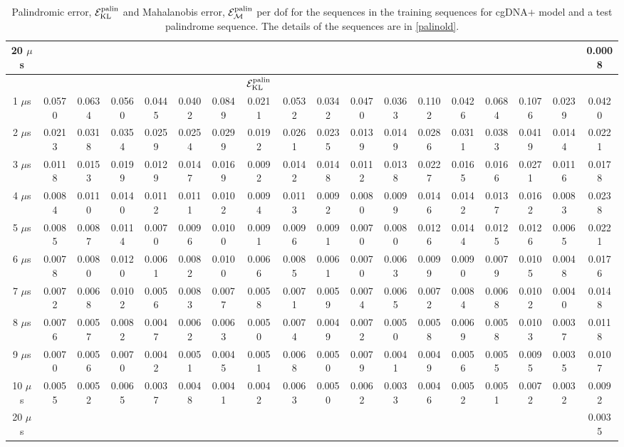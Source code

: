 \begin{table}
\begin{center}
\begin{footnotesize}
\begin{tabular}{| c | c c c c c c c c c c c c c c c c | c | }
20 $\mu$s & & & & & & & & & & & & & & & & & 0.0008 \\ \hline
& & & & & & & ${\mathcal E}_{\text{KL}}^{\text{palin}}$ & & & & & & & & & & \\ \hline
1  $\mu$s & 0.0570 & 0.0634 & 0.0560 & 0.0445 & 0.0402 & 0.0849 & 0.0211 & 0.0532 & 0.0342 & 0.0470 & 0.0363 & 0.1102 & 0.0426 & 0.0684 & 0.1076 & 0.0239 & 0.0420 \\ \hline
2  $\mu$s & 0.0213 & 0.0318 & 0.0354 & 0.0259 & 0.0254 & 0.0299 & 0.0192 & 0.0261 & 0.0235 & 0.0139 & 0.0149 & 0.0286 & 0.0311 & 0.0383 & 0.0419 & 0.0144 & 0.0221 \\ \hline
3  $\mu$s & 0.0118 & 0.0153 & 0.0199 & 0.0129 & 0.0147 & 0.0169 & 0.0092 & 0.0142 & 0.0148 & 0.0112 & 0.0138 & 0.0227 & 0.0165 & 0.0166 & 0.0271 & 0.0116 & 0.0178 \\ \hline
4  $\mu$s & 0.0084 & 0.0110 & 0.0140 & 0.0112 & 0.0111 & 0.0102 & 0.0094 & 0.0113 & 0.0092 & 0.0080 & 0.0099 & 0.0146 & 0.0142 & 0.0137 & 0.0162 & 0.0083 & 0.0238 \\ \hline
5  $\mu$s & 0.0085 & 0.0087 & 0.0114 & 0.0070 & 0.0096 & 0.0100 & 0.0091 & 0.0096 & 0.0091 & 0.0070 & 0.0080 & 0.0126 & 0.0144 & 0.0125 & 0.0126 & 0.0065 & 0.0221 \\ \hline
6  $\mu$s & 0.0078 & 0.0080 & 0.0120 & 0.0061 & 0.0082 & 0.0100 & 0.0066 & 0.0085 & 0.0061 & 0.0070 & 0.0063 & 0.0099 & 0.0090 & 0.0079 & 0.0105 & 0.0048 & 0.0176 \\ \hline
7  $\mu$s & 0.0072 & 0.0068 & 0.0102 & 0.0056 & 0.0083 & 0.0077 & 0.0058 & 0.0071 & 0.0059 & 0.0074 & 0.0065 & 0.0072 & 0.0084 & 0.0068 & 0.0102 & 0.0040 & 0.0148 \\ \hline
8  $\mu$s & 0.0076 & 0.0057 & 0.0082 & 0.0047 & 0.0062 & 0.0063 & 0.0050 & 0.0074 & 0.0049 & 0.0072 & 0.0050 & 0.0058 & 0.0069 & 0.0058 & 0.0103 & 0.0037 & 0.0118 \\ \hline
9  $\mu$s & 0.0070 & 0.0056 & 0.0070 & 0.0042 & 0.0051 & 0.0045 & 0.0051 & 0.0068 & 0.0050 & 0.0079 & 0.0041 & 0.0049 & 0.0056 & 0.0055 & 0.0095 & 0.0035 & 0.0107 \\ \hline
10 $\mu$s & 0.0055 & 0.0052 & 0.0065 & 0.0037 & 0.0048 & 0.0041 & 0.0042 & 0.0063 & 0.0050 & 0.0062 & 0.0033 & 0.0046 & 0.0052 & 0.0051 & 0.0072 & 0.0032 & 0.0092 \\ \hline
20 $\mu$s & & & & & & & & & & & & & & & & & 0.0035 \\ \hline
\end{tabular}
\end{footnotesize}
\end{center}
\caption{Palindromic error, ${\mathcal E}_{\text{KL}}^{\text{palin}}$ and Mahalanobis error, ${\mathcal E}_{\mathcal{M}}^{\text{palin}}$ per dof for the sequences in the training sequences for cgDNA$+$ model and a test palindrome sequence. The details of the sequences are in \cref{palinold}.
}
\label{c3:tab_con_dna}
\end{table} \clearpage

